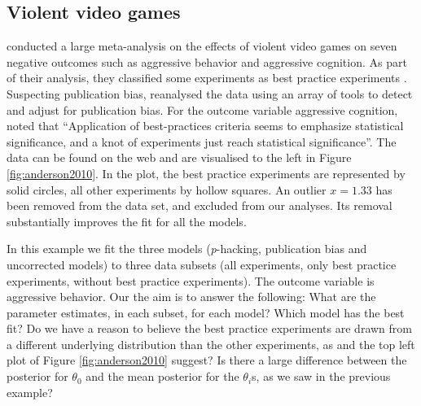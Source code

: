 \documentclass[useAMS,usenatbib,referee]{biom}
\providecommand{\DIFaddtex}[1]{{\protect\color{green}\uwave{#1}}} %
\providecommand{\DIFaddbegin}{} %
\providecommand{\DIFaddend}{} %
\providecommand{\DIFdelbegin}{} %
\providecommand{\DIFdelend}{} %
\providecommand{\DIFadd}[1]{\texorpdfstring{\DIFaddtex{#1}}{#1}} %
\begin{document}
\subsection{Violent video games\label{subsec:Anderson}}

\citet{anderson2010violent} conducted a large meta-analysis on the effects of violent video games on seven negative outcomes such as aggressive behavior and aggressive cognition. As part of their analysis, they classified some experiments as best practice experiments \citep[for more details, see Table 2 of][]{anderson2010violent}. Suspecting publication bias, \citet{hilgard2017overstated} reanalysed the data using an array of tools to detect and adjust for publication bias. For the outcome variable aggressive cognition, \citet{hilgard2017overstated} noted that \enquote{Application of best-practices criteria seems to emphasize statistical significance, and a knot of experiments just reach statistical significance}. The data can be found on the web \citep{Hilgard2017} and are visualised to the left in Figure \ref{fig:anderson2010}. In the plot, the best practice experiments are represented by solid circles, all other experiments by hollow squares. An outlier $x=1.33$ has been removed from the data set, and excluded from our analyses. Its removal substantially improves the fit for all the models. 

In this example we fit the three models (\textit{p}-hacking, publication bias and uncorrected models) to three data subsets (all experiments, only best practice experiments, without best practice experiments). The outcome variable is aggressive behavior. Our the aim is to answer the following: \DIFdelbegin %
\DIFdelend \DIFaddbegin \DIFadd{(1) }\DIFaddend What are the parameter estimates, in each subset, for each model? \DIFdelbegin %
\DIFdelend \DIFaddbegin \DIFadd{(2) }\DIFaddend Which model has the best fit? \DIFdelbegin %
\DIFdelend \DIFaddbegin \DIFadd{(3) }\DIFaddend Do we have a reason to believe the best practice experiments are drawn from a different underlying distribution than the other experiments, as \citet{hilgard2017overstated} and the top left plot of Figure \ref{fig:anderson2010} suggest? \DIFdelbegin %
\DIFdelend \DIFaddbegin \DIFadd{(4) }\DIFaddend Is there a large difference between the posterior for $\theta_{0}$ and the mean posterior for the $\theta_{i}$s, as we saw in the previous example?
\DIFdelbegin %
\DIFdelend 
\end{document}
